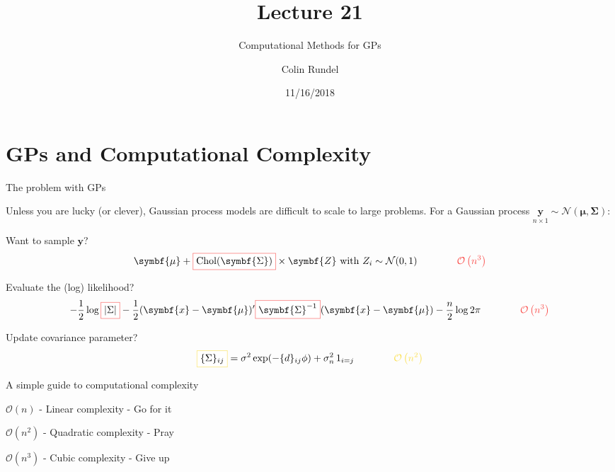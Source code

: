 \documentclass[11pt,ignorenonframetext,]{beamer}
\title{Lecture 21}
\subtitle{Computational Methods for GPs}
\author{Colin Rundel}
\date{11/16/2018}
\newcommand{\hlr}[1]{\fcolorbox{redhl}{white}{$\displaystyle #1$}}
\newcommand{\hly}[1]{\fcolorbox{yellowhl}{white}{$\displaystyle #1$}}
\begin{document}
\frame{\titlepage}

\hypertarget{gps-and-computational-complexity}{%
\section{GPs and Computational
Complexity}\label{gps-and-computational-complexity}}

\begin{frame}{The problem with GPs}
\protect\hypertarget{the-problem-with-gps}{}

Unless you are lucky (or clever), Gaussian process models are difficult
to scale to large problems. For a Gaussian process
\(\underset{n \times 1}{\symbf{y}} \sim \mathcal{N}(\symbf{\mu},\symbf{\Sigma})\):

\pause

\vspace{3mm}

Want to sample \(\symbf{y}\)?
\[ \symbf{\mu} + \hlr{\text{Chol}(\symbf{\Sigma})} \times \symbf{Z} \text{ with } Z_i \sim \mathcal{N}(0,1) \qquad \qquad \color{redhl}{\mathcal{O}\left(n^3\right)} \]

\pause

Evaluate the (log) likelihood?
\[ -\frac{1}{2} \log \hlr{|\Sigma|} - \frac{1}{2} (\symbf{x}-\symbf{\mu})' \hlr{\symbf{\Sigma}^{-1}} (\symbf{x}-\symbf{\mu}) - \frac{n}{2}\log 2\pi \qquad \qquad \color{redhl}{\mathcal{O}\left(n^3\right)}\]

\pause

Update covariance parameter?
\[ \hly{\{\Sigma\}_{ij}} = \sigma^2 \exp(-\{d\}_{ij}\phi) + \sigma^2_n \, 1_{i=j} \qquad \qquad \color{yellowhl}{\mathcal{O}\left(n^2\right)}\]

\end{frame}

\begin{frame}{A simple guide to computational complexity}
\protect\hypertarget{a-simple-guide-to-computational-complexity}{}

\Large

\begin{center}
\vfill
$\mathcal{O}\left(n\right)$ - Linear complexity \pause- Go for it \pause

\vspace{15mm}

$\mathcal{O}\left(n^2\right)$ - Quadratic complexity \pause- Pray \pause

\vspace{15mm}

$\mathcal{O}\left(n^3\right)$ - Cubic complexity \pause- Give up

\vfill
\end{center}

\end{frame}
\end{document}
